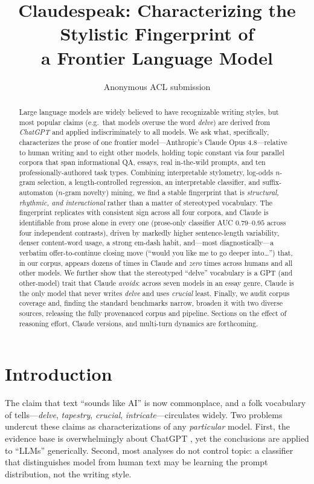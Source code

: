 \documentclass[11pt]{article}
\title{Claudespeak: Characterizing the Stylistic Fingerprint of \\ a Frontier Language Model}
\author{Anonymous ACL submission}
\begin{document}
\maketitle

\begin{abstract}
Large language models are widely believed to have recognizable writing styles,
but most popular claims (e.g.\ that models overuse the word \emph{delve}) are
derived from \emph{ChatGPT} and applied indiscriminately to all models. We ask
what, specifically, characterizes the prose of one frontier model---Anthropic's
Claude Opus 4.8---relative to human writing and to eight other models, holding
topic constant via four parallel corpora that span informational QA, essays, real
in-the-wild prompts, and ten professionally-authored task types. Combining
interpretable stylometry, log-odds $n$-gram selection, a length-controlled
regression, an interpretable classifier, and suffix-automaton ($n$-gram novelty)
mining, we find a stable fingerprint that is \emph{structural, rhythmic, and
interactional} rather than a matter of stereotyped vocabulary. The fingerprint
replicates with consistent sign across all four corpora, and Claude is
identifiable from prose alone in every one (prose-only classifier AUC
$0.79$--$0.95$ across four independent contrasts), driven by markedly higher
sentence-length variability, denser content-word usage, a strong em-dash habit,
and---most diagnostically---a verbatim offer-to-continue closing move (``would you
like me to go deeper into\ldots'') that, in our corpus, appears dozens of times in
Claude and \emph{zero} times across humans and all other models.
We further show that the stereotyped ``delve'' vocabulary is a GPT (and
other-model) trait that Claude \emph{avoids}: across seven models in an essay
genre, Claude is the only model that never writes \emph{delve} and uses
\emph{crucial} least. Finally, we audit corpus coverage and, finding the standard
benchmarks narrow, broaden it with two diverse sources, releasing the fully
provenanced corpus and pipeline. Sections on the effect of reasoning effort,
Claude versions, and multi-turn dynamics are forthcoming.
\end{abstract}

\section{Introduction}
The claim that text ``sounds like AI'' is now commonplace, and a folk
vocabulary of tells---\emph{delve}, \emph{tapestry}, \emph{crucial},
\emph{intricate}---circulates widely. Two problems undercut these claims as
characterizations of any \emph{particular} model. First, the evidence base is
overwhelmingly about ChatGPT \citep{kobak2024delving}, yet the conclusions are
applied to ``LLMs'' generically. Second, most analyses do not control topic: a
classifier that distinguishes model from human text may be learning the prompt
distribution, not the writing style.
\end{document}
